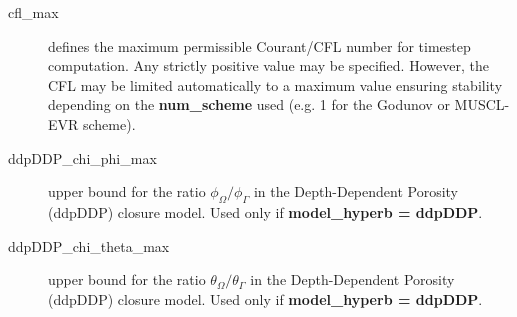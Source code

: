 \begin{description}

\item[cfl\_max]  defines the maximum permissible Courant/CFL number for timestep computation. Any strictly positive value may be specified. However, the CFL may be limited automatically to a maximum value ensuring stability depending on the \textbf{num\_scheme} used (e.g. 1 for the Godunov or MUSCL-EVR scheme).

\item [ddpDDP\_chi\_phi\_max]    upper bound for the ratio $\phi_\Omega / \phi_\Gamma$ in the Depth-Dependent Porosity (ddpDDP) closure model. Used only if \textbf{model\_hyperb = ddpDDP}.

\item [ddpDDP\_chi\_theta\_max]    upper bound for the ratio $\theta_\Omega / \theta_\Gamma$ in the Depth-Dependent Porosity (ddpDDP) closure model. Used only if \textbf{model\_hyperb = ddpDDP}.


\end{description}
